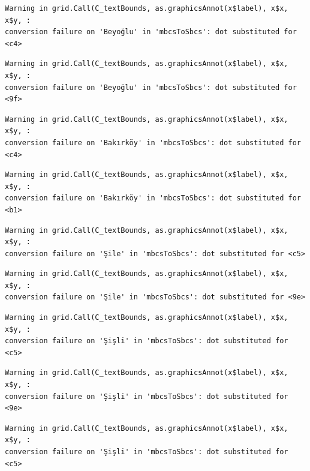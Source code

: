 \documentclass[
  11pt,
  a4paper,
  DIV=11,
  numbers=noendperiod]{scrartcl}
\begin{document}
\begin{verbatim}
Warning in grid.Call(C_textBounds, as.graphicsAnnot(x$label), x$x, x$y, :
conversion failure on 'Beyoğlu' in 'mbcsToSbcs': dot substituted for <c4>
\end{verbatim}

\begin{verbatim}
Warning in grid.Call(C_textBounds, as.graphicsAnnot(x$label), x$x, x$y, :
conversion failure on 'Beyoğlu' in 'mbcsToSbcs': dot substituted for <9f>
\end{verbatim}

\begin{verbatim}
Warning in grid.Call(C_textBounds, as.graphicsAnnot(x$label), x$x, x$y, :
conversion failure on 'Bakırköy' in 'mbcsToSbcs': dot substituted for <c4>
\end{verbatim}

\begin{verbatim}
Warning in grid.Call(C_textBounds, as.graphicsAnnot(x$label), x$x, x$y, :
conversion failure on 'Bakırköy' in 'mbcsToSbcs': dot substituted for <b1>
\end{verbatim}

\begin{verbatim}
Warning in grid.Call(C_textBounds, as.graphicsAnnot(x$label), x$x, x$y, :
conversion failure on 'Şile' in 'mbcsToSbcs': dot substituted for <c5>
\end{verbatim}

\begin{verbatim}
Warning in grid.Call(C_textBounds, as.graphicsAnnot(x$label), x$x, x$y, :
conversion failure on 'Şile' in 'mbcsToSbcs': dot substituted for <9e>
\end{verbatim}

\begin{verbatim}
Warning in grid.Call(C_textBounds, as.graphicsAnnot(x$label), x$x, x$y, :
conversion failure on 'Şişli' in 'mbcsToSbcs': dot substituted for <c5>
\end{verbatim}

\begin{verbatim}
Warning in grid.Call(C_textBounds, as.graphicsAnnot(x$label), x$x, x$y, :
conversion failure on 'Şişli' in 'mbcsToSbcs': dot substituted for <9e>
\end{verbatim}

\begin{verbatim}
Warning in grid.Call(C_textBounds, as.graphicsAnnot(x$label), x$x, x$y, :
conversion failure on 'Şişli' in 'mbcsToSbcs': dot substituted for <c5>
\end{verbatim}
\end{document}
